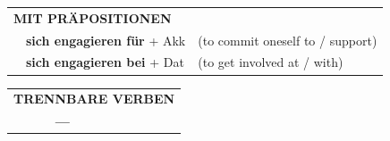 \begin{verbentry}
\vspace{10pt}

\begin{tabular}{lll}
\multicolumn{3}{l}{\textbf{MIT PRÄPOSITIONEN}}\\
& \textbf{sich engagieren für} + Akk & (to commit oneself to / support)\\
& \textbf{sich engagieren bei} + Dat & (to get involved at / with)\\
\end{tabular}
\hfill
\begin{tabular}{lll}
\multicolumn{3}{l}{\textbf{TRENNBARE VERBEN}}\\
& \textbf{---} & \\
\end{tabular}
\vspace{-5pt}
\end{verbentry}

